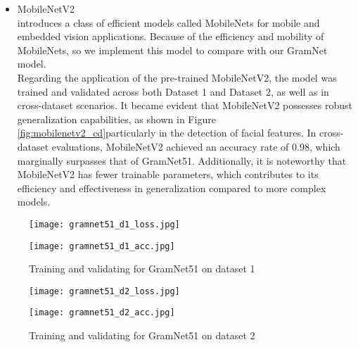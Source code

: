 \documentclass[rebuttal]{cvpr}
\begin{document}
\begin{itemize}
        \item MobileNetV2 \\
        \cite{howard2017mobilenets} introduces a class of efficient models called MobileNets for mobile and embedded vision applications. Because of the efficiency and mobility of MobileNets, so we implement this model to compare with our GramNet model. \\
        
        Regarding the application of the pre-trained MobileNetV2, the model was trained and validated across both Dataset 1 and Dataset 2, as well as in cross-dataset scenarios. It became evident that MobileNetV2 possesses robust generalization capabilities, as shown in Figure \ref{fig:mobilenetv2_cd}particularly in the detection of facial features. In cross-dataset evaluations, MobileNetV2 achieved an accuracy rate of 0.98, which marginally surpasses that of GramNet51. Additionally, it is noteworthy that MobileNetV2 has fewer trainable parameters, which contributes to its efficiency and effectiveness in generalization compared to more complex models.
\end{itemize}

\begin{figure*}[t]
\centering
\begin{minipage}{0.45\linewidth}
   \texttt{[image: gramnet51\_d1\_loss.jpg]}
   \label{fig:image1}
\end{minipage}
\hfill
\begin{minipage}{0.45\linewidth}
   \texttt{[image: gramnet51\_d1\_acc.jpg]}
   \label{fig:image2}
\end{minipage}
\caption{Training and validating for GramNet51 on dataset 1}
\label{fig:gramnet51_d1}
\end{figure*}

\begin{figure*}[t]
\centering
\begin{minipage}{0.45\linewidth}
   \texttt{[image: gramnet51\_d2\_loss.jpg]}
   \label{fig:image1}
\end{minipage}
\hfill
\begin{minipage}{0.45\linewidth}
   \texttt{[image: gramnet51\_d2\_acc.jpg]}
   \label{fig:image2}
\end{minipage}
\caption{Training and validating for GramNet51 on dataset 2}
\label{fig:gramnet51_d2}
\end{figure*}
\end{document}
